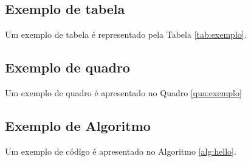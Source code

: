 \subsection{Exemplo de tabela}

Um exemplo de tabela é representado pela Tabela \ref{tab:exemplo}.



\subsection{Exemplo de quadro}

Um exemplo de quadro é apresentado no Quadro \ref{qua:exemplo}



\subsection{Exemplo de Algoritmo}

Um exemplo de código é apresentado no Algoritmo \ref{alg:hello}.

